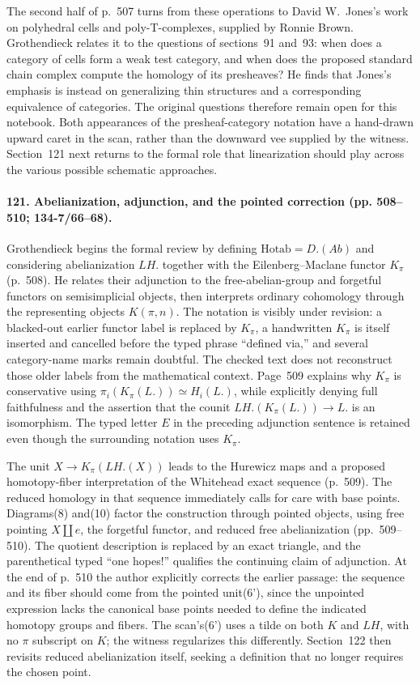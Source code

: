 The second half of p.~507 turns from these operations to David W.~Jones's work on polyhedral cells and poly-T-complexes, supplied by Ronnie Brown. Grothendieck relates it to the questions of sections~91 and~93: when does a category of cells form a weak test category, and when does the proposed standard chain complex compute the homology of its presheaves? He finds that Jones's emphasis is instead on generalizing thin structures and a corresponding equivalence of categories. The original questions therefore remain open for this notebook. Both appearances of the presheaf-category notation have a hand-drawn upward caret in the scan, rather than the downward vee supplied by the witness. Section~121 next returns to the formal role that linearization should play across the various possible schematic approaches.

\paragraph{121. Abelianization, adjunction, and the pointed correction (pp. 508--510; 134-7/66--68).}
Grothendieck begins the formal review by defining $\mathrm{Hotab}=D.(Ab)$ and considering abel\-ian\-iza\-tion $LH.$ together with the Eilenberg--Maclane functor $K_\pi$ (p.~508). He relates their adjunction to the free-abelian-group and forgetful functors on semisimplicial objects, then interprets ordinary cohomology through the representing objects $K(\pi,n)$. The notation is visibly under revision: a blacked-out earlier functor label is replaced by $K_\pi$, a handwritten $K_\pi$ is itself inserted and cancelled before the typed phrase ``defined via,'' and several category-name marks remain doubtful. The checked text does not reconstruct those older labels from the mathematical context. Page~509 explains why $K_\pi$ is conservative using $\pi_i(K_\pi(L.))\simeq H_i(L.)$, while explicitly denying full faithfulness and the assertion that the counit $LH.(K_\pi(L.))\to L.$ is an isomorphism. The typed letter $E$ in the preceding adjunction sentence is retained even though the surrounding notation uses $K_\pi$.

The unit $X\to K_\pi(LH.(X))$ leads to the Hurewicz maps and a proposed homotopy-fiber interpretation of the Whitehead exact sequence (p.~509). The reduced homology in that sequence immediately calls for care with base points. Diagrams(8) and(10) factor the construction through pointed objects, using free pointing $X\amalg e$, the forgetful functor, and reduced free abelianization (pp.~509--510). The quotient description is replaced by an exact triangle, and the parenthetical typed ``one hopes!'' qualifies the continuing claim of adjunction. At the end of p.~510 the author explicitly corrects the earlier passage: the sequence and its fiber should come from the pointed unit(6'), since the unpointed expression lacks the canonical base points needed to define the indicated homotopy groups and fibers. The scan's(6') uses a tilde on both $K$ and $LH$, with no $\pi$ subscript on $K$; the witness regularizes this differently. Section~122 then revisits reduced abelianization itself, seeking a definition that no longer requires the chosen point.


